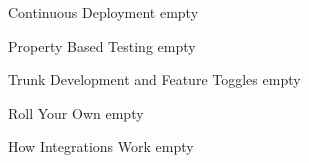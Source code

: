 \documentclass{beamer}
\begin{document}
\begin{frame}{Continuous Deployment}
	empty
\end{frame}

\begin{frame}{Property Based Testing}
	empty
\end{frame}

\begin{frame}{Trunk Development and Feature Toggles}
	empty
\end{frame}

\begin{frame}{Roll Your Own}
	empty
\end{frame}

\begin{frame}{How Integrations Work}
	empty
\end{frame}
\end{document}
